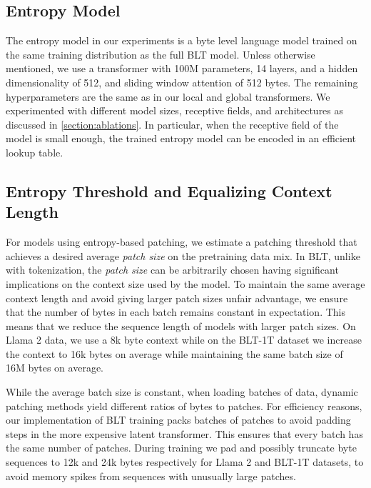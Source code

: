 \subsection{Entropy Model} The entropy model in our experiments is a byte level language model trained on the same training distribution as the full {\textsc BLT} model. Unless otherwise mentioned, we use a transformer with 100M parameters, 14 layers, and a hidden dimensionality of 512, and sliding window attention of 512 bytes. The remaining hyperparameters are the same as in our local and global transformers. We  experimented with different model sizes, receptive fields, and architectures as discussed in \autoref{section:ablations}. In particular, when the receptive field of the model is small enough, the trained entropy model can be encoded in an efficient lookup table.

\subsection{Entropy Threshold and Equalizing Context Length} For models using entropy-based patching, we estimate a patching threshold that achieves a desired average \textit{patch size} on the pretraining data mix.  In {\textsc BLT}, unlike with tokenization, the \textit{patch size} can be arbitrarily chosen having significant implications on the context size used by the model. To maintain the same average context length and avoid giving larger patch sizes unfair advantage, we ensure that the number of bytes in each batch remains constant in expectation. This means that we reduce the sequence length of models with larger patch sizes. On Llama 2 data, we use a 8k byte context while on the {\textsc BLT}-1T dataset we increase the context to 16k bytes on average while maintaining the same batch size of 16M bytes on average.

While the average batch size is constant, when loading batches of data, dynamic patching methods yield different ratios of bytes to patches. For efficiency reasons, our implementation of {\textsc BLT} training packs batches of patches to avoid padding steps in the more expensive latent transformer. This ensures that every batch has the same number of patches. During training we pad and possibly truncate byte sequences to 12k and 24k bytes respectively for Llama 2 and {\textsc BLT}-1T datasets, to avoid memory spikes from sequences with unusually large patches.

